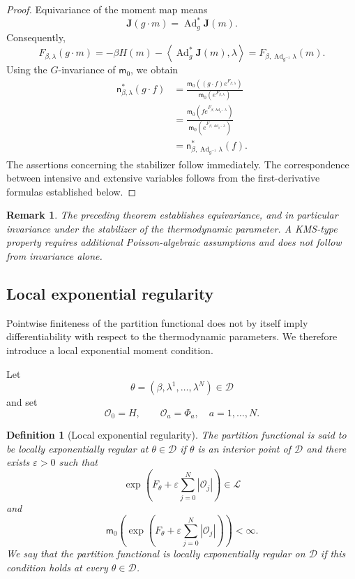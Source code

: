 \documentclass[10pt,a4paper]{amsart}
\newtheorem{Definition}[Theorem]{Definition}
\newtheorem{rem}[Theorem]{Remark}
\begin{document}
\begin{proof}
Equivariance of the moment map means
\[
\mathbf J(g\cdot m)=\operatorname{Ad}_g^*\mathbf J(m).
\]
Consequently,
\[
F_{\beta,\lambda}(g\cdot m)
=
-\beta H(m)
-
\left\langle
\operatorname{Ad}_g^*\mathbf J(m),\lambda
\right\rangle
=
F_{\beta,\operatorname{Ad}_{g^{-1}}\lambda}(m).
\]
Using the $G$-invariance of $\mathsf m_0$, we obtain
\[
\begin{split}
\mathsf n_{\beta,\lambda}^{*}(g\cdot f)
&=
\frac{
\mathsf m_0\left((g\cdot f)e^{F_{\beta,\lambda}}\right)
}{
\mathsf m_0\left(e^{F_{\beta,\lambda}}\right)
}
\\
&=
\frac{
\mathsf m_0\left(
f e^{F_{\beta,\operatorname{Ad}_{g^{-1}}\lambda}}
\right)
}{
\mathsf m_0\left(
e^{F_{\beta,\operatorname{Ad}_{g^{-1}}\lambda}}
\right)
}
\\
&=
\mathsf n_{\beta,\operatorname{Ad}_{g^{-1}}\lambda}^{*}(f).
\end{split}
\]
The assertions concerning the stabilizer follow immediately. The
correspondence between intensive and extensive variables follows from
the first-derivative formulas established below.
\end{proof}


\begin{rem}
The preceding theorem establishes equivariance, and in particular
invariance under the stabilizer of the thermodynamic parameter. A
KMS-type property requires additional Poisson-algebraic assumptions and
does not follow from invariance alone.
\end{rem}

\subsection{Local exponential regularity}
\label{subsec:local-exponential-regularity}

Pointwise finiteness of the partition functional does not by itself
imply differentiability with respect to the thermodynamic parameters.
We therefore introduce a local exponential moment condition.

Let
\[
\theta=(\beta,\lambda^1,\ldots,\lambda^N)\in\mathcal D
\]
and set
\[
\mathcal O_0=H,
\qquad
\mathcal O_a=\Phi_a,
\quad
a=1,\ldots,N.
\]

\begin{Definition}[Local exponential regularity]
\label{def:local-exponential-regularity}
The partition functional is said to be
\emph{locally exponentially regular at $\theta\in\mathcal D$} if
$\theta$ is an interior point of $\mathcal D$ and there exists
$\varepsilon>0$ such that
\[
\exp\left(
F_\theta+\varepsilon\sum_{j=0}^{N}|\mathcal O_j|
\right)
\in\mathcal L
\]
and
\[
\mathsf m_0\left(
\exp\left(
F_\theta+\varepsilon\sum_{j=0}^{N}|\mathcal O_j|
\right)
\right)
<\infty.
\]
We say that the partition functional is locally exponentially regular
on $\mathcal D$ if this condition holds at every
$\theta\in\mathcal D$.
\end{Definition}
\end{document}

